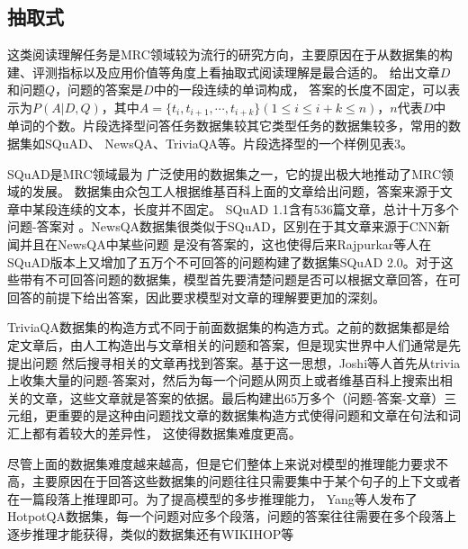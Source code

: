 \subsection{抽取式}
这类阅读理解任务是MRC领域较为流行的研究方向，主要原因在于从数据集的构建、评测指标以及应用价值等角度上看抽取式阅读理解是最合适的。
给出文章$D$和问题$Q$，问题的答案是$D$中的一段连续的单词构成，
答案的长度不固定，可以表示为$P(A|D,Q)$，其中$A=\{t_i,t_{i+1},\cdots,t_{i+k}\}(1\leq i\leq i+k\leq n)$，$n$代表$D$中
单词的个数。片段选择型问答任务数据集较其它类型任务的数据集较多，常用的数据集如SQuAD、
NewsQA、TriviaQA等。片段选择型的一个样例见表3。

SQuAD是MRC领域最为
广泛使用的数据集之一，它的提出极大地推动了MRC领域的发展。
数据集由众包工人根据维基百科上面的文章给出问题，答案来源于文章中某段连续的文本，长度并不固定。
SQuAD 1.1含有536篇文章，总计十万多个问题-答案对
。NewsQA数据集很类似于SQuAD，区别在于其文章来源于CNN新闻并且在NewsQA中某些问题
是没有答案的，这也使得后来Rajpurkar等人在SQuAD版本上又增加了五万个不可回答的问题构建了数据集SQuAD 2.0。对于这些带有不可回答问题的数据集，模型首先要清楚问题是否可以根据文章回答，在可回答的前提下给出答案，因此要求模型对文章的理解要更加的深刻。

TriviaQA数据集的构造方式不同于前面数据集的构造方式。之前的数据集都是给定文章后，由人工构造出与文章相关的问题和答案，但是现实世界中人们通常是先提出问题
然后搜寻相关的文章再找到答案。基于这一思想，Joshi等人首先从trivia上收集大量的问题-答案对，然后为每一个问题从网页上或者维基百科上搜索出相关的文章，这些文章就是答案的依据。最后构建出65万多个（问题-答案-文章）三元组，更重要的是这种由问题找文章的数据集构造方式使得问题和文章在句法和词汇上都有着较大的差异性，
这使得数据集难度更高。

尽管上面的数据集难度越来越高，但是它们整体上来说对模型的推理能力要求不高，主要原因在于回答这些数据集的问题往往只需要集中于某个句子的上下文或者在一篇段落上推理即可。为了提高模型的多步推理能力，
Yang等人发布了HotpotQA数据集，每一个问题对应多个段落，问题的答案往往需要在多个段落上逐步推理才能获得，类似的数据集还有WIKIHOP等

